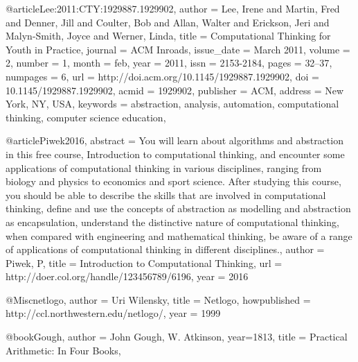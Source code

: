 @article{Lee:2011:CTY:1929887.1929902,
 author = {Lee, Irene and Martin, Fred and Denner, Jill and Coulter, Bob and Allan, Walter and Erickson, Jeri and Malyn-Smith, Joyce and Werner, Linda},
 title = {Computational Thinking for Youth in Practice},
 journal = {ACM Inroads},
 issue_date = {March 2011},
 volume = {2},
 number = {1},
 month = feb,
 year = {2011},
 issn = {2153-2184},
 pages = {32--37},
 numpages = {6},
 url = {http://doi.acm.org/10.1145/1929887.1929902},
 doi = {10.1145/1929887.1929902},
 acmid = {1929902},
 publisher = {ACM},
 address = {New York, NY, USA},
 keywords = {abstraction, analysis, automation, computational thinking, computer science education},
} 



@article{Piwek2016,
abstract = {You will learn about algorithms and abstraction in this free course, Introduction to computational thinking, and encounter some applications of computational thinking in various disciplines, ranging from biology and physics to economics and sport science. After studying this course, you should be able to describe the skills that are involved in computational thinking, define and use the concepts of abstraction as modelling and abstraction as encapsulation, understand the distinctive nature of computational thinking, when compared with engineering and mathematical thinking, be aware of a range of applications of computational thinking in different disciplines.},
author = {Piwek, P},
title = {{Introduction to Computational Thinking}},
url = {http://doer.col.org/handle/123456789/6196},
year = {2016}
}

@Misc{netlogo,
author =   {Uri Wilensky},
title =    {Netlogo},
howpublished = {http://ccl.northwestern.edu/netlogo/},
year = {1999}
}

@book{Gough,
	author = {John Gough, W. Atkinson},
	year={1813},
	title = {Practical Arithmetic: In Four Books},
}

